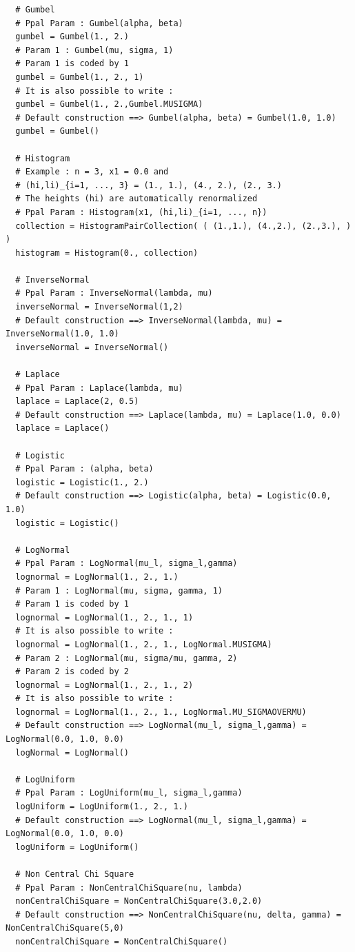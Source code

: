 \begin{lstlisting}
  # Gumbel
  # Ppal Param : Gumbel(alpha, beta)
  gumbel = Gumbel(1., 2.)
  # Param 1 : Gumbel(mu, sigma, 1)
  # Param 1 is coded by 1
  gumbel = Gumbel(1., 2., 1)
  # It is also possible to write :
  gumbel = Gumbel(1., 2.,Gumbel.MUSIGMA)
  # Default construction ==> Gumbel(alpha, beta) = Gumbel(1.0, 1.0)
  gumbel = Gumbel()

  # Histogram
  # Example : n = 3, x1 = 0.0 and
  # (hi,li)_{i=1, ..., 3} = (1., 1.), (4., 2.), (2., 3.)
  # The heights (hi) are automatically renormalized
  # Ppal Param : Histogram(x1, (hi,li)_{i=1, ..., n})
  collection = HistogramPairCollection( ( (1.,1.), (4.,2.), (2.,3.), ) )
  histogram = Histogram(0., collection)

  # InverseNormal
  # Ppal Param : InverseNormal(lambda, mu)
  inverseNormal = InverseNormal(1,2)
  # Default construction ==> InverseNormal(lambda, mu) = InverseNormal(1.0, 1.0)
  inverseNormal = InverseNormal()

  # Laplace
  # Ppal Param : Laplace(lambda, mu)
  laplace = Laplace(2, 0.5)
  # Default construction ==> Laplace(lambda, mu) = Laplace(1.0, 0.0)
  laplace = Laplace()

  # Logistic
  # Ppal Param : (alpha, beta)
  logistic = Logistic(1., 2.)
  # Default construction ==> Logistic(alpha, beta) = Logistic(0.0, 1.0)
  logistic = Logistic()

  # LogNormal
  # Ppal Param : LogNormal(mu_l, sigma_l,gamma)
  lognormal = LogNormal(1., 2., 1.)
  # Param 1 : LogNormal(mu, sigma, gamma, 1)
  # Param 1 is coded by 1
  lognormal = LogNormal(1., 2., 1., 1)
  # It is also possible to write :
  lognormal = LogNormal(1., 2., 1., LogNormal.MUSIGMA)
  # Param 2 : LogNormal(mu, sigma/mu, gamma, 2)
  # Param 2 is coded by 2
  lognormal = LogNormal(1., 2., 1., 2)
  # It is also possible to write :
  lognormal = LogNormal(1., 2., 1., LogNormal.MU_SIGMAOVERMU)
  # Default construction ==> LogNormal(mu_l, sigma_l,gamma) = LogNormal(0.0, 1.0, 0.0)
  logNormal = LogNormal()

  # LogUniform
  # Ppal Param : LogUniform(mu_l, sigma_l,gamma)
  logUniform = LogUniform(1., 2., 1.)
  # Default construction ==> LogNormal(mu_l, sigma_l,gamma) = LogNormal(0.0, 1.0, 0.0)
  logUniform = LogUniform()

  # Non Central Chi Square
  # Ppal Param : NonCentralChiSquare(nu, lambda)
  nonCentralChiSquare = NonCentralChiSquare(3.0,2.0)
  # Default construction ==> NonCentralChiSquare(nu, delta, gamma) = NonCentralChiSquare(5,0)
  nonCentralChiSquare = NonCentralChiSquare()



\end{lstlisting}
